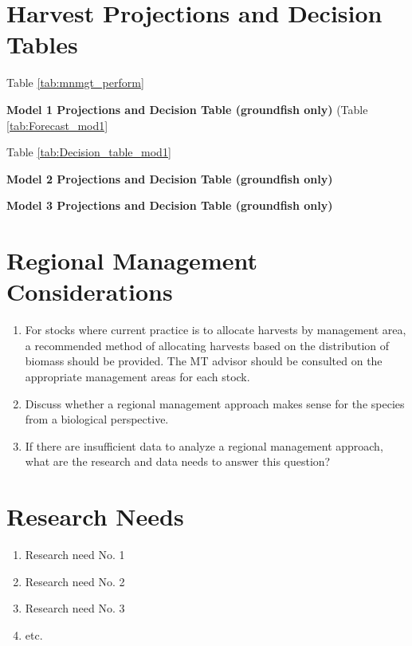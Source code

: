 \documentclass[12pt,]{article}
\providecommand{\tightlist}{%
  \setlength{\itemsep}{0pt}\setlength{\parskip}{0pt}}
\begin{document}
\section{Harvest Projections and Decision
Tables}\label{harvest-projections-and-decision-tables}

Table \ref{tab:mnmgt_perform}

\textbf{Model 1 Projections and Decision Table (groundfish only)} (Table
\ref{tab:Forecast_mod1}

Table \ref{tab:Decision_table_mod1}

\textbf{Model 2 Projections and Decision Table (groundfish only)}

\textbf{Model 3 Projections and Decision Table (groundfish only)}

\section{Regional Management
Considerations}\label{regional-management-considerations}

\begin{enumerate}
\def\labelenumi{\arabic{enumi}.}
\tightlist
\item
  For stocks where current practice is to allocate harvests by
  management area, a recommended method of allocating harvests based on
  the distribution of biomass should be provided. The MT advisor should
  be consulted on the appropriate management areas for each stock.
\item
  Discuss whether a regional management approach makes sense for the
  species from a biological perspective.
\item
  If there are insufficient data to analyze a regional management
  approach, what are the research and data needs to answer this
  question?
\end{enumerate}

\section{Research Needs}\label{research-needs}

\begin{enumerate}

\item Research need No. 1

\item Research need No. 2

\item Research need No. 3

\item etc.

\end{enumerate}
\end{document}
